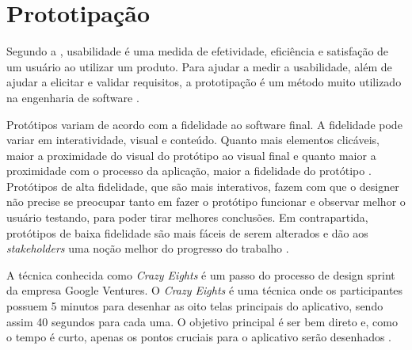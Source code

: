 \section{Prototipação}

Segundo a , usabilidade é uma medida de efetividade, eficiência e satisfação de um usuário ao utilizar um produto. Para ajudar a medir a usabilidade, além de ajudar a elicitar e validar requisitos, a prototipação é um método muito utilizado na engenharia de software \cite{sommerville}.

Protótipos variam de acordo com a fidelidade ao software final. A fidelidade pode variar em interatividade, visual e conteúdo. Quanto mais elementos clicáveis, maior a proximidade do visual do protótipo ao visual final e quanto maior a proximidade com o processo da aplicação, maior a fidelidade do protótipo \cite{nielsen}. Protótipos de alta fidelidade, que são mais interativos, fazem com que o designer não precise se preocupar tanto em fazer o protótipo funcionar e observar melhor o usuário testando, para poder tirar melhores conclusões. Em contrapartida, protótipos de baixa fidelidade são mais fáceis de serem alterados e dão aos \textit{stakeholders} uma noção melhor do progresso do trabalho \cite{nielsen}.

A técnica conhecida como \textit{Crazy Eights} é um passo do processo de design sprint da empresa Google Ventures. O \textit{Crazy Eights} é uma técnica onde os participantes possuem 5 minutos para desenhar as oito telas principais do aplicativo, sendo assim 40 segundos para cada uma. O objetivo principal é ser bem direto e, como o tempo é curto, apenas os pontos cruciais para o aplicativo serão desenhados \cite{knapp}.
